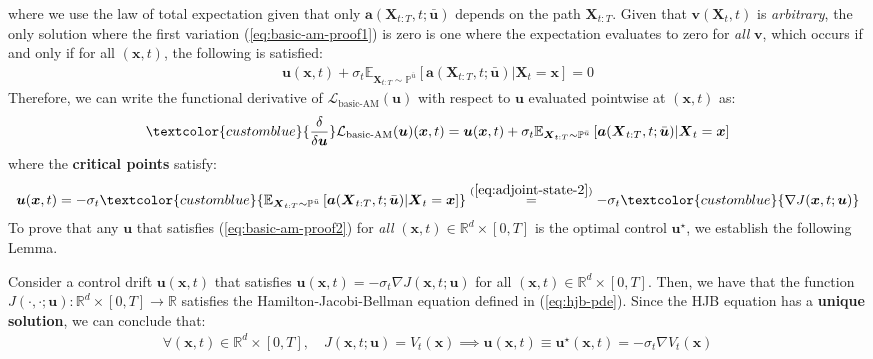 \documentclass{article}
\newcommand{\bluetext}[1]{\textcolor{customblue}{#1}}
\begin{document}
where we use the law of total expectation given that only $\boldsymbol{a}(\boldsymbol{X}_{t:T}, t; \bar{\boldsymbol{u}})$ depends on the path $\boldsymbol{X}_{t:T}$. Given that $\boldsymbol{v}(\boldsymbol{X}_t, t)$ is \textit{arbitrary}, the only solution where the first variation (\ref{eq:basic-am-proof1}) is zero is one where the expectation evaluates to zero for \textit{all} $\boldsymbol{v}$, which occurs if and only if for all $(\boldsymbol{x},t)$, the following is satisfied:
\begin{align}
    \boldsymbol{u}(\boldsymbol{x},t)+\sigma_t\mathbb{E}_{\boldsymbol{X}_{t:T}\sim \mathbb{P}^{\bar{u}}}\left[\boldsymbol{a}(\boldsymbol{X}_{t:T}, t; \bar{\boldsymbol{u}})|\boldsymbol{X}_t=\boldsymbol{x}\right]=0
\end{align}
Therefore, we can write the functional derivative of $\mathcal{L}_{\text{basic-AM}}(\boldsymbol{u})$ with respect to $\boldsymbol{u}$ evaluated pointwise at $(\boldsymbol{x},t)$ as:
\begin{align}
    \bluetext{\frac{\delta}{\delta \boldsymbol{u}}}\mathcal{L}_{\text{basic-AM}}(\boldsymbol{u})(\boldsymbol{x},t)=\boldsymbol{u}(\boldsymbol{x},t)+\sigma_t\mathbb{E}_{\boldsymbol{X}_{t:T}\sim \mathbb{P}^{\bar{u}}}\left[\boldsymbol{a}(\boldsymbol{X}_{t:T}, t; \bar{\boldsymbol{u}})|\boldsymbol{X}_t=\boldsymbol{x}\right]\label{eq:basic-am-functional-derivative}
\end{align}
where the \textbf{critical points} satisfy:
\begin{align}
    \boldsymbol{u}(\boldsymbol{x},t)=-\sigma_t\bluetext{\mathbb{E}_{\boldsymbol{X}_{t:T}\sim \mathbb{P}^{\bar{u}}}\left[\boldsymbol{a}(\boldsymbol{X}_{t:T}, t; \bar{\boldsymbol{u}})|\boldsymbol{X}_t=\boldsymbol{x}\right]}\overset{(\ref{eq:adjoint-state-2})}{=}-\sigma_t\bluetext{\nabla J(\boldsymbol{x},t;\boldsymbol{u})}\label{eq:basic-am-proof2}
\end{align}
To prove that any $\boldsymbol{u}$ that satisfies (\ref{eq:basic-am-proof2}) for \textit{all} $(\boldsymbol{x},t)\in \mathbb{R}^d\times[0,T]$ is the optimal control $\boldsymbol{u}^\star$, we establish the following Lemma.

\begin{proposition}\label{prop:basic-adjoint-loss}
    Consider a control drift $\boldsymbol{u}(\boldsymbol{x},t)$ that satisfies $\boldsymbol{u}(\boldsymbol{x},t)=-\sigma_t\nabla J(\boldsymbol{x},t;\boldsymbol{u})$ for all $(\boldsymbol{x},t)\in \mathbb{R}^d \times [0,T]$. Then, we have that the function $J(\cdot, \cdot; \boldsymbol{u}): \mathbb{R}^d\times [0,T]\to \mathbb{R}$ satisfies the Hamilton-Jacobi-Bellman equation defined in (\ref{eq:hjb-pde}). Since the HJB equation has a \textbf{unique solution}, we can conclude that:
    \begin{align}
        \forall (\boldsymbol{x},t)\in \mathbb{R}^d\times [0,T], \quad J(\boldsymbol{x},t;\boldsymbol{u})=V_t(\boldsymbol{x})\implies \boldsymbol{u}(\boldsymbol{x},t)\equiv\boldsymbol{u}^\star(\boldsymbol{x},t)=-\sigma_t\nabla V_t(\boldsymbol{x})
    \end{align}
\end{proposition}
\end{document}
